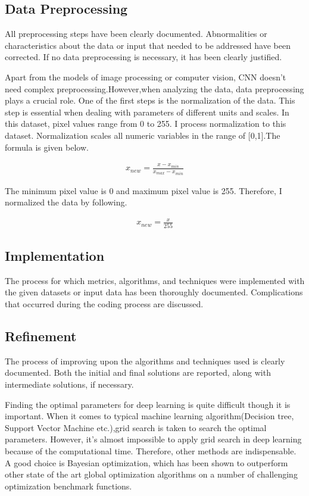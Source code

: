 \documentclass[a4paper,10pt,fleqn]{article}
\begin{document}
\subsection{Data Preprocessing}
All preprocessing steps have been clearly documented. Abnormalities or characteristics about the data or input that needed to be addressed have been corrected. If no data preprocessing is necessary, it has been clearly justified.

Apart from the models of image processing or computer vision, CNN doesn't need complex preprocessing.However,when analyzing the data, data preprocessing plays a crucial role. One of the first steps is the normalization of the data. This step is essential when dealing with parameters of different units and scales. In this dataset, pixel values range from 0 to 255. I process normalization to this dataset.
Normalization scales all numeric variables in the range of [0,1].The formula is given below.

\begin{eqnarray}
x_{new}=\frac{x-x_{min}}{x_{max}-x_{min}}
\end{eqnarray}

The minimum pixel value is 0 and maximum pixel value is 255. Therefore, I normalized the data by following.



\begin{eqnarray}
x_{new}=\frac{x}{255}
\end{eqnarray}

\subsection{Implementation}
The process for which metrics, algorithms, and techniques were implemented with the given datasets or input data has been thoroughly documented. Complications that occurred during the coding process are discussed.






\subsection{Refinement}
The process of improving upon the algorithms and techniques used is clearly documented. Both the initial and final solutions are reported, along with intermediate solutions, if necessary.

Finding the optimal parameters for deep learning is quite difficult though it is important. When it comes to typical machine learning algorithm(Decision tree, Support Vector Machine etc.),grid search is taken to search the optimal parameters. However, it's almost impossible to apply grid search in deep learning because of the computational time. Therefore, other methods are indispensable. A good choice is Bayesian optimization, which has been shown to outperform other state of the art global optimization algorithms on a number of challenging optimization benchmark functions.
\end{document}
